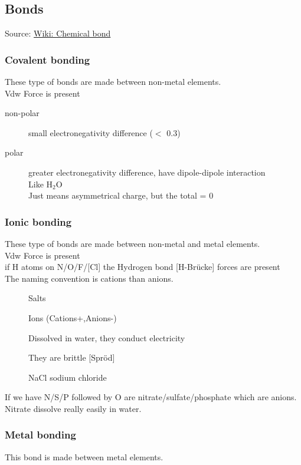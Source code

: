 \subsection{Bonds}
Source: \href{https://en.wikipedia.org/wiki/Chemical_bond}{Wiki: Chemical bond}

\subsubsection{Covalent bonding}
These type of bonds are made between non-metal elements.\\
Vdw Force is present

\begin{description}
    \item[non-polar] small electronegativity difference ($<$ 0.3)
    \item[polar] greater electronegativity difference, have dipole-dipole interaction\\
        Like $\text{H}_2\text{O}$\\
        Just means asymmetrical charge, but the total = 0
\end{description}

\subsubsection{Ionic bonding}
These type of bonds are made between non-metal and metal elements.
\\
Vdw Force is present\\
if H atoms on N/O/F/[Cl] the Hydrogen bond [H-Brücke] forces are present\\ 
The naming convention is cations than anions.\\

\begin{description}
    \item[] Salts
    \item[] Ions (Cations+,Anions-)
    \item[] Dissolved in water, they conduct electricity
    \item[] They are brittle [Spröd]
    \item[] NaCl \arrow sodium chloride
\end{description}
%
If we have N/S/P followed by O are nitrate/sulfate/phosphate which are anions.\\
Nitrate dissolve really easily in water.

\subsubsection{Metal bonding}
This bond is made between metal elements.

